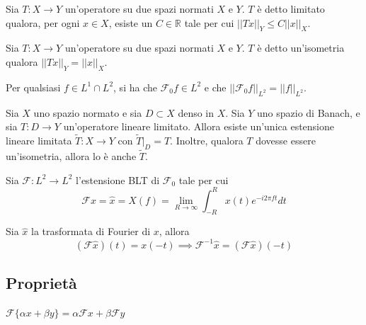         \begin{definition}
            Sia $T: X \rightarrow Y$ un'operatore su due spazi normati $X$ e $Y$.
            $T$ è detto limitato qualora, per ogni $x \in X$, esiste un $C \in \mathbb{R}$ tale per cui $||Tx||_{Y} \leq C||x||_{X}$.
        \end{definition}

        \begin{definition}
            Sia $T: X \rightarrow Y$ un'operatore su due spazi normati $X$ e $Y$.
            $T$ è detto un'isometria qualora $||Tx||_{Y} = ||x||_{X}$.
        \end{definition}

        \begin{theorem}
            Per qualsiasi $f \in L^1 \cap L^2$, si ha che $\mathcal{F}_0 f \in L^2$ e che $||\mathcal{F}_0 f||_{L^2} = ||f||_{L^2}$.
        \end{theorem}

        \begin{theorem}
            Sia $X$ uno spazio normato e sia $D \subset X$ denso in $X$. 
            Sia $Y$ uno spazio di Banach, e sia $T: D \rightarrow Y$ un'operatore lineare limitato.
            Allora esiste un'unica estensione lineare limitata $\tilde{T}: X \rightarrow Y$ con $\tilde{T}|_{D} = T$. 
            Inoltre, qualora $T$ dovesse essere un'isometria, allora lo è anche $\tilde{T}$.
        \end{theorem}

        \begin{definition}
            Sia $\mathcal{F}: L^2 \rightarrow L^2$ l'estensione BLT di $\mathcal{F}_0$ tale per cui
            \[
                \mathcal{F} x = \hat{x} = X(f) = \lim_{R \rightarrow \infty} \int_{-R}^{R} x(t) e^{-i 2 \pi f t} dt
            \]
        \end{definition}

        \begin{lemma}
            Sia $\hat{x}$ la trasformata di Fourier di $x$, allora
            \[
                (\mathcal{F}\hat{x})(t) = x(-t) \implies \mathcal{F}^{-1} \hat{x} = (\mathcal{F} \hat{x})(-t)
            \]
        \end{lemma}

    \subsection{Proprietà}
        \begin{property}[Linearità]
            $\mathcal{F}\{\alpha x + \beta y\} = \alpha \mathcal{F} x + \beta \mathcal{F} y$
        \end{property}

